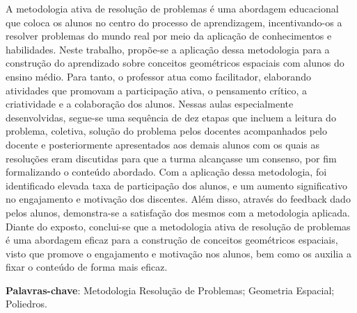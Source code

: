 
\setlength{\absparsep}{18pt} %
\begin{resumo}

    A metodologia ativa de resolução de problemas é uma abordagem educacional que coloca os alunos no centro do processo de aprendizagem, incentivando-os a resolver problemas do mundo real por meio da aplicação de conhecimentos e habilidades. Neste trabalho, propõe-se a aplicação dessa metodologia para a construção do aprendizado sobre conceitos geométricos espaciais com alunos do ensino médio. Para tanto, o professor atua como facilitador, elaborando atividades que promovam a participação ativa, o pensamento crítico, a criatividade e a colaboração dos alunos. Nessas aulas especialmente desenvolvidas, segue-se uma sequência de dez etapas que incluem a leitura do problema, coletiva, solução do problema pelos docentes acompanhados pelo docente e posteriormente apresentados aos demais alunos com os quais as resoluções eram discutidas para que a turma alcançasse um consenso, por fim formalizando o conteúdo abordado. Com a aplicação dessa metodologia, foi identificado elevada taxa de participação dos alunos, e um aumento significativo no engajamento e motivação dos discentes. Além disso, através do feedback dado pelos alunos, demonstra-se a satisfação dos mesmos com a metodologia aplicada. Diante do exposto, conclui-se que a metodologia ativa de resolução de problemas é uma abordagem eficaz para a construção de conceitos geométricos espaciais, visto que promove o engajamento e motivação nos alunos, bem como os auxilia a fixar o conteúdo de forma mais eficaz.

    \textbf{Palavras-chave}:  Metodologia Resolução de Problemas; Geometria Espacial; Poliedros.

\end{resumo}
